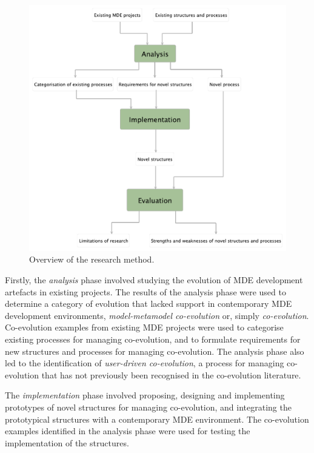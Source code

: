 \begin{figure}[htbp]
  \begin{center}
    \leavevmode
    \includegraphics[width=12cm]{1.Introduction/images/method.pdf}
  \end{center}
  \caption{Overview of the research method.}
  \label{fig:research_method}
\end{figure}


Firstly, the \emph{analysis} phase involved studying the evolution of MDE development artefacts in existing projects. The results of the analysis phase were used to determine a category of evolution that lacked support in contemporary MDE development environments, \emph{model-metamodel co-evolution} or, simply \emph{co-evolution}. Co-evolution examples from existing MDE projects were used to categorise existing processes for managing co-evolution, and to formulate requirements for new structures and processes for managing co-evolution. The analysis phase also led to the identification of \emph{user-driven co-evolution}, a process for managing co-evolution that has not previously been recognised in the co-evolution literature.

The \emph{implementation} phase involved proposing, designing and implementing prototypes of novel structures for managing co-evolution, and integrating the prototypical structures with a contemporary MDE environment. The co-evolution examples identified in the analysis phase were used for testing the implementation of the structures.

